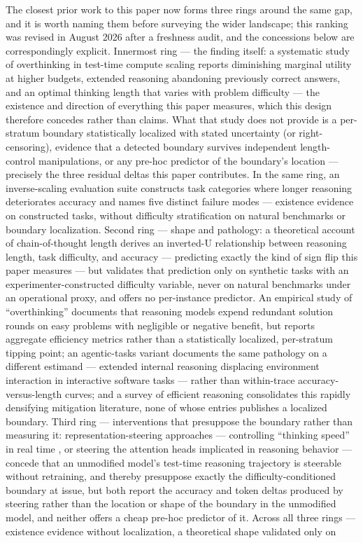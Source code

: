 \documentclass[11pt]{article}
\begin{document}
The closest prior work to this paper now forms three rings around the same gap, and it is worth naming them before surveying the wider landscape; this ranking was revised in August 2026 after a freshness audit, and the concessions below are correspondingly explicit. Innermost ring --- the finding itself: a systematic study of overthinking in test-time compute scaling \cite{WhenMoreThinkingHurts2604} reports diminishing marginal utility at higher budgets, extended reasoning abandoning previously correct answers, and an optimal thinking length that varies with problem difficulty --- the existence and direction of everything this paper measures, which this design therefore concedes rather than claims. What that study does not provide is a per-stratum boundary statistically localized with stated uncertainty (or right-censoring), evidence that a detected boundary survives independent length-control manipulations, or any pre-hoc predictor of the boundary's location --- precisely the three residual deltas this paper contributes. In the same ring, an inverse-scaling evaluation suite \cite{InverseScalingTTC2507} constructs task categories where longer reasoning deteriorates accuracy and names five distinct failure modes --- existence evidence on constructed tasks, without difficulty stratification on natural benchmarks or boundary localization. Second ring --- shape and pathology: a theoretical account of chain-of-thought length \cite{WhenMoreIsLess6QDF} derives an inverted-U relationship between reasoning length, task difficulty, and accuracy --- predicting exactly the kind of sign flip this paper measures --- but validates that prediction only on synthetic tasks with an experimenter-constructed difficulty variable, never on natural benchmarks under an operational proxy, and offers no per-instance predictor. An empirical study of ``overthinking'' \cite{Chen2024Overthinking} documents that reasoning models expend redundant solution rounds on easy problems with negligible or negative benefit, but reports aggregate efficiency metrics rather than a statistically localized, per-stratum tipping point; an agentic-tasks variant \cite{DangerOverthinking2502} documents the same pathology on a different estimand --- extended internal reasoning displacing environment interaction in interactive software tasks --- rather than within-trace accuracy-versus-length curves; and a survey of efficient reasoning \cite{StopOverthinkingSurvey2503} consolidates this rapidly densifying mitigation literature, none of whose entries publishes a localized boundary. Third ring --- interventions that presuppose the boundary rather than measuring it: representation-steering approaches --- controlling ``thinking speed'' in real time \cite{ThinkingSpeedESEL}, or steering the attention heads implicated in reasoning behavior \cite{251224574} --- concede that an unmodified model's test-time reasoning trajectory is steerable without retraining, and thereby presuppose exactly the difficulty-conditioned boundary at issue, but both report the accuracy and token deltas produced by steering rather than the location or shape of the boundary in the unmodified model, and neither offers a cheap pre-hoc predictor of it. Across all three rings --- existence evidence without localization, a theoretical shape validated only on 
\end{document}
